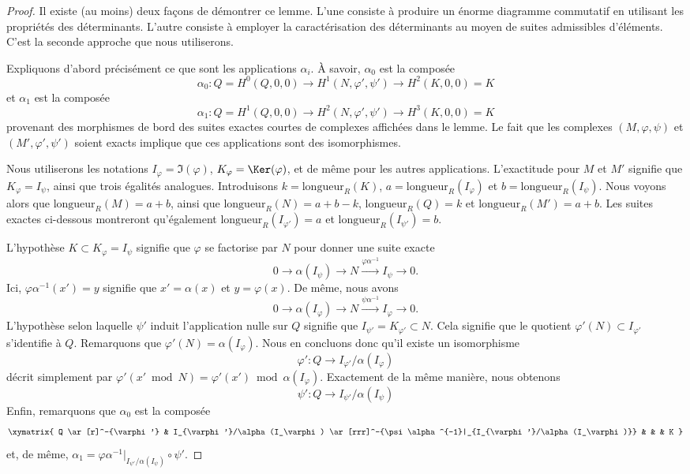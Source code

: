 \begin{proof}
Il existe (au moins) deux façons de démontrer ce lemme. L'une consiste à produire un
énorme diagramme commutatif en utilisant les propriétés des déterminants.
L'autre consiste à employer la caractérisation des déterminants au moyen
de suites admissibles d'éléments. C'est la seconde approche que nous
utiliserons.

\medskip\noindent
Expliquons d'abord précisément ce que sont les applications $\alpha_i$.
À savoir, $\alpha_0$ est la composée
$$
\alpha_0 : Q = H^0(Q, 0, 0) \to H^1(N, \varphi', \psi') \to H^2(K, 0, 0) = K
$$
et $\alpha_1$ est la composée
$$
\alpha_1 : Q = H^1(Q, 0, 0) \to H^2(N, \varphi', \psi') \to H^3(K, 0, 0) = K
$$
provenant des morphismes de bord des suites exactes courtes de complexes
affichées dans le lemme. Le fait que les
complexes $(M, \varphi, \psi)$ et $(M', \varphi', \psi')$ soient exacts
implique que ces applications sont des isomorphismes.

\medskip\noindent
Nous utiliserons les notations $I_\varphi = \Im(\varphi)$,
$K_\varphi = \Ker(\varphi)$, et de même pour les autres applications.
L'exactitude pour $M$ et $M'$
signifie que $K_\varphi = I_\psi$, ainsi que trois égalités analogues.
Introduisons $k = \text{longueur}_R(K)$, $a = \text{longueur}_R(I_\varphi)$
et $b = \text{longueur}_R(I_\psi)$. Nous voyons alors que $\text{longueur}_R(M) = a + b$,
ainsi que $\text{longueur}_R(N) = a + b - k$, $\text{longueur}_R(Q) = k$
et $\text{longueur}_R(M') = a + b$. Les suites exactes ci-dessous montreront
qu'également $\text{longueur}_R(I_{\varphi'}) = a$ et
$\text{longueur}_R(I_{\psi'}) = b$.

\medskip\noindent
L'hypothèse $K \subset K_\varphi = I_\psi$ signifie que
$\varphi$ se factorise par $N$ pour donner une suite exacte
$$
0 \to \alpha(I_\psi) \to N \xrightarrow{\varphi\alpha^{-1}} I_\psi \to 0.
$$
Ici, $\varphi\alpha^{-1}(x') = y$ signifie que $x' = \alpha(x)$ et $y = \varphi(x)$.
De même, nous avons
$$
0 \to \alpha(I_\varphi) \to N \xrightarrow{\psi\alpha^{-1}} I_\varphi \to 0.
$$
L'hypothèse selon laquelle $\psi'$ induit l'application nulle sur
$Q$ signifie que $I_{\psi'} = K_{\varphi'} \subset N$.
Cela signifie que le quotient $\varphi'(N) \subset I_{\varphi'}$
s'identifie à $Q$. Remarquons que $\varphi'(N) = \alpha(I_\varphi)$.
Nous en concluons donc qu'il existe un isomorphisme
$$
\varphi' : Q \to I_{\varphi'}/\alpha(I_\varphi)
$$
décrit simplement par
$\varphi'(x' \bmod N) = \varphi'(x') \bmod \alpha(I_\varphi)$.
Exactement de la même manière, nous obtenons
$$
\psi' : Q \to I_{\psi'}/\alpha(I_\psi)
$$
Enfin, remarquons que $\alpha_0$ est la composée
$$
\xymatrix{
Q \ar[r]^-{\varphi'} &
I_{\varphi'}/\alpha(I_\varphi)
\ar[rrr]^-{\psi\alpha^{-1}|_{I_{\varphi'}/\alpha(I_\varphi)}} & & &
K
}
$$
et, de même,
$\alpha_1 = \varphi\alpha^{-1}|_{I_{\psi'}/\alpha(I_\psi)} \circ \psi'$.


\end{proof}
